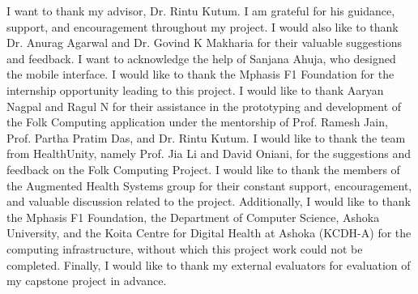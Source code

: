 I want to thank my advisor, Dr. Rintu Kutum. I am grateful for his guidance, support, and encouragement throughout my project. I would also like to thank Dr. Anurag Agarwal and Dr. Govind K Makharia for their valuable suggestions and feedback. I want to acknowledge the help of Sanjana Ahuja, who designed the mobile interface. I would like to thank the Mphasis F1 Foundation for the internship opportunity leading to this project. I would like to thank Aaryan Nagpal and Ragul N for their assistance in the prototyping and development of the Folk Computing application under the mentorship of Prof. Ramesh Jain, Prof. Partha Pratim Das, and Dr. Rintu Kutum. I would like to thank the team from HealthUnity, namely Prof. Jia Li and David Oniani, for the suggestions and feedback on the Folk Computing Project. I would like to thank the members of the Augmented Health Systems group for their constant support, encouragement, and valuable discussion related to the project. Additionally, I would like to thank the Mphasis F1 Foundation, the Department of Computer Science, Ashoka University, and the Koita Centre for Digital Health at Ashoka (KCDH-A) for the computing infrastructure, without which this project work could not be completed. Finally, I would like to thank my external evaluators for evaluation of my capstone project in advance.
